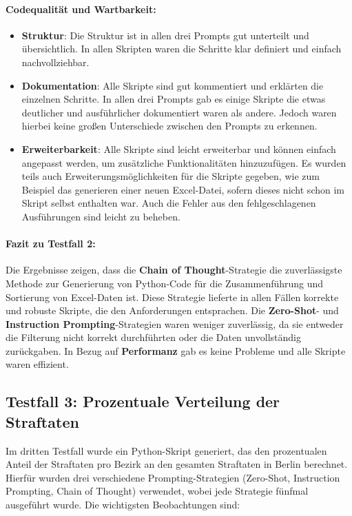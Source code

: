 \documentclass[11pt,a4paper]{article}
\begin{document}
\paragraph{Codequalität und Wartbarkeit:}
\begin{itemize}
    \item \textbf{Struktur}: Die Struktur ist in allen drei Prompts gut unterteilt und übersichtlich. In allen Skripten waren die Schritte klar definiert und einfach nachvollziehbar.
    \item \textbf{Dokumentation}: Alle Skripte sind gut kommentiert und erklärten die einzelnen Schritte. In allen drei Prompts gab es einige Skripte die etwas deutlicher und ausführlicher dokumentiert waren als andere. Jedoch waren hierbei keine großen Unterschiede zwischen den Prompts zu erkennen.
    \item \textbf{Erweiterbarkeit}: Alle Skripte sind leicht erweiterbar und können einfach angepasst werden, um zusätzliche Funktionalitäten hinzuzufügen. Es wurden teils auch Erweiterungsmöglichkeiten für die Skripte gegeben, wie zum Beispiel das generieren einer neuen Excel-Datei, sofern dieses nicht schon im Skript selbst enthalten war. Auch die Fehler aus den fehlgeschlagenen Ausführungen sind leicht zu beheben.
\end{itemize}

\paragraph{Fazit zu Testfall 2:}
Die Ergebnisse zeigen, dass die \textbf{Chain of Thought}-Strategie die zuverlässigste Methode zur Generierung von Python-Code für die Zusammenführung und Sortierung von Excel-Daten ist. Diese Strategie lieferte in allen Fällen korrekte und robuste Skripte, die den Anforderungen entsprachen. Die \textbf{Zero-Shot}- und \textbf{Instruction Prompting}-Strategien waren weniger zuverlässig, da sie entweder die Filterung nicht korrekt durchführten oder die Daten unvollständig zurückgaben. In Bezug auf \textbf{Performanz} gab es keine Probleme und alle Skripte waren effizient.

\subsection{Testfall 3: Prozentuale Verteilung der Straftaten}
\label{subsec:auswertung_testfall3}

Im dritten Testfall wurde ein Python-Skript generiert, das den prozentualen Anteil der Straftaten pro Bezirk an den gesamten Straftaten in Berlin berechnet. Hierfür wurden drei verschiedene Prompting-Strategien (Zero-Shot, Instruction Prompting, Chain of Thought) verwendet, wobei jede Strategie fünfmal ausgeführt wurde. Die wichtigsten Beobachtungen sind:
\end{document}
